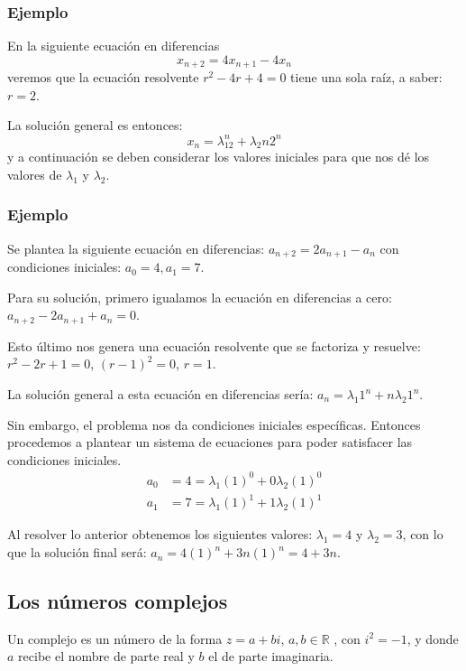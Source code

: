 \documentclass{article}
\begin{document}
\subsubsection{Ejemplo}

En la siguiente ecuación en diferencias
\begin{equation}
  \label{eq:1}
  x_{n+2}=4x_{n+1}-4x_{n}
\end{equation}
veremos que la ecuación resolvente $r^2-4r+4=0$ tiene una sola raíz, a
saber: $r=2$.

La solución general es entonces:
$$x_n=\lambda_12^n+\lambda_2n2^n$$
y a continuación se deben considerar los valores iniciales para que
nos dé los valores de $\lambda_1$ y $\lambda_2$.

\subsubsection{Ejemplo}

Se plantea la siguiente ecuación en diferencias:
$a_{n+2}=2a_{n+1}-a_{n}$ con condiciones iniciales: $a_{0}=4, a_{1}=7$.

Para su solución, primero igualamos la ecuación en diferencias a
cero: $a_{n+2}-2a_{n+1}+a_{n}=0$.

Esto último nos genera una ecuación resolvente que se factoriza y
resuelve: $r^2-2r+1=0$, ${(r-1)^2=0}$, ${r=1}$.

La solución general a esta ecuación en diferencias sería:
$a_{n}=\lambda_{1}1^n+n\lambda_{2}1^n$.

Sin embargo, el problema nos da condiciones iniciales
específicas. Entonces procedemos a plantear un sistema de ecuaciones
para poder satisfacer las condiciones iniciales.
\begin{align*}
  \label{sistema2}
  a_{0}&=4=\lambda_{1}(1)^0+0\lambda_{2}(1)^0\\
  a_{1}&=7=\lambda_{1}(1)^1+1\lambda_{2}(1)^1
\end{align*}

Al resolver lo anterior obtenemos los siguientes valores:
$\lambda_{1}=4$ y $\lambda_{2}=3$, con lo que la solución final será:
$a_{n}=4(1)^n+3n(1)^n=4+3n$.


\subsection{Los números  complejos}

Un complejo es un número de la forma $z=a+bi$, $a,b\in\mathbb{R}$ ,
con $i^2=-1$, y donde $a$ recibe el nombre de parte real y $b$ el de
parte imaginaria.
\end{document}

